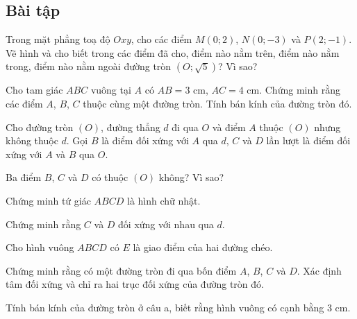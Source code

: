 \begin{exercises}
    \subsection{Bài tập}

    \begin{questions}[series=SGK]
        \item Trong mặt phẳng toạ độ $Oxy$, cho các điểm $M(0;2)$, $N(0;-3)$ và $P(2;-1)$. Vẽ hình và cho biết trong các điểm đã cho, điểm nào nằm trên, điểm nào nằm trong, điểm nào nằm ngoài đường tròn $(O;\sqrt{5})$? Vì sao?

        \answerline
        \answerline

        \item Cho tam giác $ABC$ vuông tại $A$ có $AB=3$ cm, $AC=4$ cm. Chứng minh rằng các điểm $A$, $B$, $C$ thuộc cùng một đường tròn. Tính bán kính của đường tròn đó.

        \answerline
        \answerline
        \answerline

        \item Cho đường tròn $(O)$, đường thẳng $d$ đi qua $O$ và điểm $A$ thuộc $(O)$ nhưng không thuộc $d$. Gọi $B$ là điểm đối xứng với $A$ qua $d$, $C$ và $D$ lần lượt là điểm đối xứng với $A$ và $B$ qua $O$.
        \begin{questions}
            \item Ba điểm $B$, $C$ và $D$ có thuộc $(O)$ không? Vì sao?

            \answerline
            \answerline
            \item Chứng minh tứ giác $ABCD$ là hình chữ nhật.

            \answerline
            \answerline
            \item Chứng minh rằng $C$ và $D$ đối xứng với nhau qua $d$.

            \answerline
            \answerline
        \end{questions}

        \item Cho hình vuông $ABCD$ có $E$ là giao điểm của hai đường chéo.
        \begin{questions}
            \item Chứng minh rằng có một đường tròn đi qua bốn điểm $A$, $B$, $C$ và $D$. Xác định tâm đối xứng và chỉ ra hai trục đối xứng của đường tròn đó.

            \answerline
            \answerline
            \answerline
            \item Tính bán kính của đường tròn ở câu a, biết rằng hình vuông có cạnh bằng $3$ cm.

            \answerline
            \answerline
        \end{questions}
    \end{questions}
\end{exercises}

